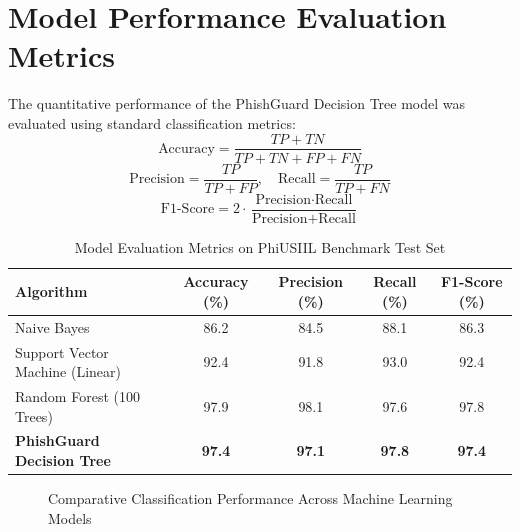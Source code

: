 \documentclass[BTech]{srmuthesis}
\begin{document}
\section{Model Performance Evaluation Metrics}
The quantitative performance of the PhishGuard Decision Tree model was evaluated using standard classification metrics:
\begin{equation}
\text{Accuracy} = \frac{TP + TN}{TP + TN + FP + FN}
\label{eq:acc}
\end{equation}
\begin{equation}
\text{Precision} = \frac{TP}{TP + FP}, \quad \text{Recall} = \frac{TP}{TP + FN}
\label{eq:prec_rec}
\end{equation}
\begin{equation}
\text{F1-Score} = 2 \cdot \frac{\text{Precision} \cdot \text{Recall}}{\text{Precision} + \text{Recall}}
\label{eq:f1}
\end{equation}

\begin{table}[htpb]
\centering
\caption{Model Evaluation Metrics on PhiUSIIL Benchmark Test Set}
\label{tab:eval_metrics}
\begin{tabular}{|l|c|c|c|c|}
\hline
\textbf{Algorithm} & \textbf{Accuracy (\%)} & \textbf{Precision (\%)} & \textbf{Recall (\%)} & \textbf{F1-Score (\%)} \\
\hline
Naive Bayes & 86.2 & 84.5 & 88.1 & 86.3 \\
\hline
Support Vector Machine (Linear) & 92.4 & 91.8 & 93.0 & 92.4 \\
\hline
Random Forest (100 Trees) & 97.9 & 98.1 & 97.6 & 97.8 \\
\hline
\textbf{PhishGuard Decision Tree} & \textbf{97.4} & \textbf{97.1} & \textbf{97.8} & \textbf{97.4} \\
\hline
\end{tabular}
\end{table}

\begin{figure}[htpb]
\centering
{}
\caption{Comparative Classification Performance Across Machine Learning Models}
\label{fig:model_chart}
\end{figure}
\end{document}
